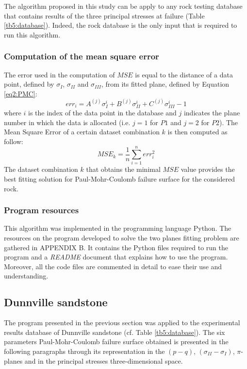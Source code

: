 The algorithm proposed in this study can be apply to any rock testing database that contains results of the three principal stresses at failure (Table \ref{tb5:database}). Indeed, the rock database is the only input that is required to run this algorithm. 

\subsubsection{Computation of the mean square error}

The error used in the computation of $MSE$ is equal to the distance of a data point, defined by $\sigma_I$, $\sigma_{II}$ and $\sigma_{III}$, from its fitted plane, defined by Equation \ref{eq2:PMC}:
\begin{equation}\label{eq5:error}
    err_{i} = A^{(j)}\sigma_I^{i}+B^{(j)}\sigma_{II}^{i}+C^{(j)}\sigma_{III}^{i} - 1
\end{equation}
where $i$ is the index of the data point in the database and $j$ indicates the plane number in which the data is allocated (i.e. $j=1$ for $P1$ and $j=2$ for $P2$). The Mean Square Error of a certain dataset combination $k$ is then computed as follow:
\begin{equation}\label{eq5:MSE}
    MSE_k = \frac{1}{n}\sum_{i=1}^{n} err_i^2
\end{equation}
The dataset combination $k$ that obtains the minimal $MSE$ value provides the best fitting solution for Paul-Mohr-Coulomb failure surface for the considered rock. 

\subsubsection{Program resources}

This algorithm was implemented in the programming language Python. The resources on the program developed to solve the two planes fitting problem are gathered in APPENDIX B. It contains the Python files required to run the program and a \emph{README} document that explains how to use the program. Moreover, all the code files are commented in detail to ease their use and understanding.  

\subsection{Dunnville sandstone}

The program presented in the previous section was applied to the experimental results database of Dunnville sandstone (cf. Table \ref{tb5:database}). The six parameters Paul-Mohr-Coulomb failure surface obtained is presented in the following paragraphs through its representation in the $(p-q)$, $(\sigma_{II}-\sigma_I)$, $\pi$- planes and in the principal stresses three-dimensional space. 

